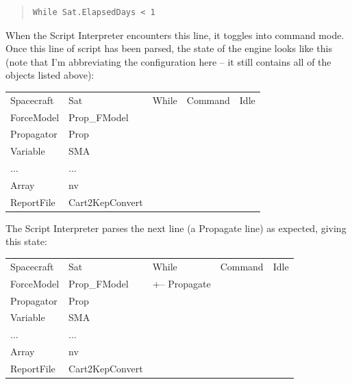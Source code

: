 \begin{quote}
\begin{verbatim}
While Sat.ElapsedDays < 1
\end{verbatim}
\end{quote}

\noindent When the Script Interpreter encounters this line, it toggles into command mode.  Once this
line of script has been parsed, the state of the engine looks like this (note that I'm abbreviating
the configuration here -- it still contains all of the objects listed above):

\begin{center}
\tablelasttail{\hline}
\begin{supertabular}{|l l|l|l|l|}
Spacecraft & Sat & While & Command & Idle\\
ForceModel & Prop\_FModel & & & \\
Propagator & Prop & & & \\
Variable & SMA & & & \\
... & ... & & & \\
Array & nv & & & \\
ReportFile & Cart2KepConvert & & & \\
\end{supertabular}
\end{center}

\noindent The Script Interpreter parses the next line (a Propagate line) as expected, giving this
state:

\begin{center}
\tablelasttail{\hline}
\begin{supertabular}{|l l|l|l|l|}
Spacecraft & Sat & While & Command & Idle\\
ForceModel & Prop\_FModel & +-- Propagate & & \\
Propagator & Prop & & & \\
Variable & SMA & & & \\
... & ... & & & \\
Array & nv & & & \\
ReportFile & Cart2KepConvert & & & \\
\end{supertabular}
\end{center}

